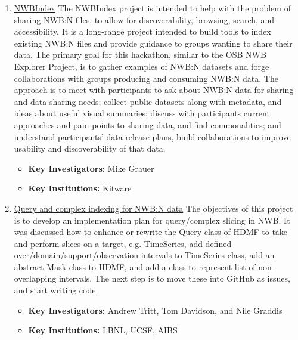 \documentclass{article}
\begin{document}
\begin{enumerate}
    \item \href{https://neurodatawithoutborders.github.io/nwb_hackathons/HCK06_2019_Janelia/projects/NWBIndex/}{NWBIndex}  The NWBIndex project is intended to help with the problem of sharing NWB:N files, to allow for discoverability, browsing, search, and accessibility. It is a long-range project intended to build tools to index existing NWB:N files and provide guidance to groups wanting to share their data. The primary goal for this hackathon, similar to the OSB NWB Explorer Project, is to gather examples of NWB:N datasets and forge collaborations with groups producing and consuming NWB:N data. The approach is to meet with participants to ask about NWB:N data for sharing and data sharing needs; collect public datasets along with metadata, and ideas about useful visual summaries; discuss with participants current approaches and pain points to sharing data, and find commonalities; and understand participants’ data release plans, build collaborations to improve usability and discoverability of that data.
        \vspace{-0.2cm}
        \begin{itemize}[noitemsep]
            \item \textbf{Key Investigators:} Mike Grauer
            \item \textbf{Key Institutions:} Kitware
        \end{itemize}
    
    \item \href{https://neurodatawithoutborders.github.io/nwb_hackathons/HCK06_2019_Janelia/projects/NWB_Query/}{Query and complex indexing for NWB:N data}  The objectives of this project is to develop an implementation plan for query/complex slicing in NWB. It was discussed how to enhance or rewrite the Query class of HDMF to take and perform slices on a target, e.g. TimeSeries, add defined-over/domain/support/observation-intervals to TimeSeries class, add an abstract Mask class to HDMF, and add a class to represent list of non-overlapping intervals. The next step is to move these into GitHub as issues, and start writing code.
        \vspace{-0.2cm}
        \begin{itemize}[noitemsep]
            \item \textbf{Key Investigators:} Andrew Tritt, Tom Davidson, and Nile Graddis
            \item \textbf{Key Institutions:} LBNL, UCSF, AIBS
        \end{itemize}
    

\end{enumerate}
\end{document}

